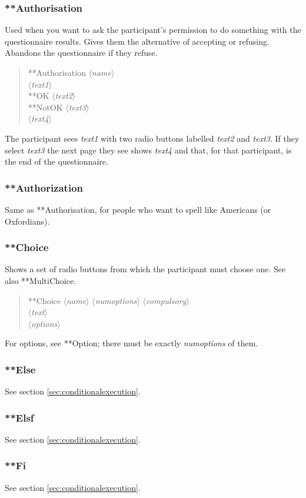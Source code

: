 \documentclass[11pt,a4paper]{article}
\newcommand{\phr}[1]{$\langle$\emph{#1}$\rangle$}
\newcommand{\secref}[1]{section \ref{sec:#1}}
\begin{document}
\subsubsection{**Authorisation}
Used when you want to ask the participant's permission to do something with the questionnaire results. Gives them the alternative of accepting or refusing. Abandons the questionnaire if they refuse.
\begin{quote}
**Authorisation \phr{name} \\
\phr{text1} \\
**OK \phr{text2} \\
**NotOK \phr{text3} \\
\phr{text4}
\end{quote}
The participant sees \emph{text1} with two radio buttons labelled \emph{text2} and \emph{text3}. If they select \emph{text3} the next page they see shows \emph{text4} and that, for that participant, is the end of the questionnaire.

\subsubsection{**Authorization}

Same as **Authorisation, for people who want to spell like Americans (or Oxfordians).

\subsubsection{**Choice}
Shows a set of radio buttons from which the participant must choose one. See also **MultiChoice.
\begin{quote}
**Choice \phr{name} \phr{numoptions} \phr{compulsory}\\
\phr{text} \\
\phr{options}
\end{quote}
For options, see **Option; there must be exactly \emph{numoptions} of them.

\subsubsection{**Else}
See \secref{conditionalexecution}.

\subsubsection{**Elsf}
See \secref{conditionalexecution}.

\subsubsection{**Fi}
See \secref{conditionalexecution}.
\end{document}
